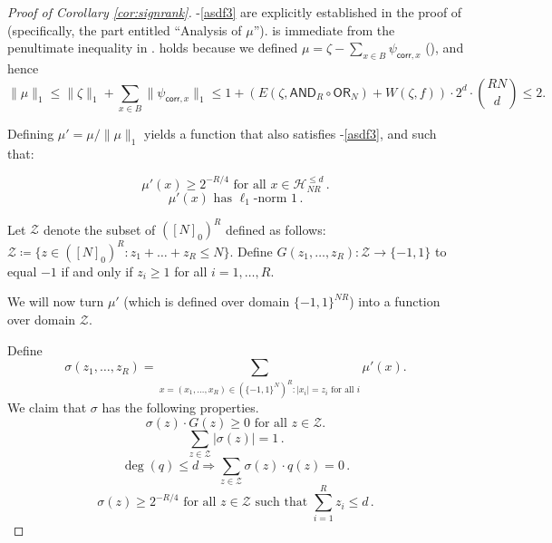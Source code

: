 \documentclass{toc}
\newcommand{\OR}{\mathsf{ OR}}
\newcommand{\bits}{\{-1,1\}}
\newcommand{\AND}{\mathsf{AND}}
\begin{document}
\begin{proof}[Proof of Corollary \ref{cor:signrank}]
-\eqref{asdf3} are explicitly established in the proof of  (specifically, the part entitled ``Analysis of $\mu$'').  %
 is immediate from the penultimate inequality in 
.
 holds because we defined $\mu= \zeta - \sum_{x \in B} \psi_{\mathsf{corr}, x}$ (),
and hence $$\|\mu\|_1 \leq \|\zeta\|_1 + \sum_{x \in B} \|\psi_{\mathsf{corr}, x}\|_1 \leq
1 + \left(E\left(\zeta, \AND_R \circ \OR_N\right) +W\left(\zeta, f\right)\right) \cdot 2^d \cdot {RN \choose d}
\leq 2.$$ 


Defining $\mu'=\mu/\|\mu\|_1$ yields a function that also satisfies
-\eqref{asdf3}, and such that:

\begin{equation} \label{nomorelabelsbrahsweet}
\mu'(x) \geq 2^{-R/4} \text{ for all } x \in \mathcal{H}_{NR}^{\leq d}\,.
\end{equation}
\begin{equation} \label{asdf42}
\mu'(x) \text{ has } \ell_1\text{-norm } 1\,.
\end{equation}



Let $\mathcal{Z}$ denote the subset of $\left([N]_0\right)^R$ defined as follows: $\mathcal{Z} \coloneqq  \{z \in \left([N]_0\right)^R \colon z_1 + \dots +z_R \leq N\}$. 
Define $G(z_1, \dots, z_R) \colon \mathcal{Z} \to \bits$ to equal $-1$
if and only if $z_i \geq 1$ for all $i=1, \dots, R.$ 


We will now turn $\mu'$ (which is defined over domain $\bits^{NR}$) into a function over domain $\mathcal{Z}$. 


Define $$\sigma(z_1, \dots, z_R) = \sum_{x=(x_1, \dots, x_R) \in \left(\bits^{N}\right)^R: |x_i|=z_i \text{ for all } i} \mu'(x).$$
We claim that $\sigma$ has
the following properties.
\begin{equation} \label{mysouliscrushed1}
\sigma(z) \cdot G(z) \geq 0 \text{ for all } z \in \mathcal{Z}.
\end{equation}
\begin{equation}
\sum_{z \in \mathcal{Z}} |\sigma(z)|=1\,. \label{brr2}
\end{equation}
\begin{equation} \label{phdsigmasigh}
\deg(q) \leq d \Longrightarrow \sum_{z \in \mathcal{Z}} \sigma(z) \cdot q(z) =0\,.
\end{equation}
\begin{equation} \label{zrp2}
\sigma(z) \geq 2^{-R/4} \text{ for all } z \in \mathcal{Z} \text{ such that } \sum_{i=1}^{R} z_i \leq d\,.
\end{equation}


\end{proof}
\end{document}
